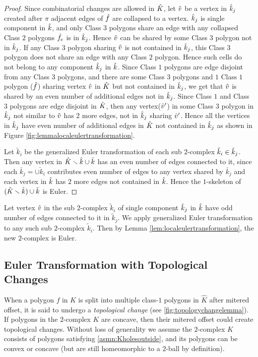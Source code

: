 \begin{proof}
  Since combinatorial changes are allowed in $\hat{K}$, let $\hat{v}$ be a vertex in $\hat{k}_j$ created after $\pi$ adjacent edges of $\hat{f}$ are collapsed to a vertex.
  $\hat{k}_j$ is single component in $\hat{k}$, and only Class $3$ polygons share an edge with any collapsed Class $2$ polygons $\hat{f}_e$ is in $\hat{k}_j$.
  Hence $\hat{v}$ can be shared by some Class $3$ polygon not in $\hat{k}_j$.
  If any Class $3$ polygon sharing $\hat{v}$ is not contained in $\hat{k}_j$, this Class $3$ polygon does not share an edge with any Class $2$ polygon.
  Hence such cells do not belong to any component $\hat{k}_j$ in $\hat{k}$.
  Since Class $1$ polygons are edge disjoint from any Class $3$ polygons, and there are some Class $3$ polygons and $1$ Class $1$ polygon ($\hat{f}$) sharing vertex $\hat{v}$ in $\hat{K}$ but not contained in $\hat{k}_j$, we get that $\hat{v}$ is shared by an even number of additional edges not in $\hat{k}_j$.
  Since Class $1$ and Class $3$ polygons are edge disjoint in $\hat{K}$, then any vertex($\hat{v}'$) in some Class $3$ polygon in $\hat{k}_j$ not similar to $\hat{v}$ has $2$ more edges, not in $\hat{k}_j$ sharing $\hat{v}'$.
  Hence all the vertices in $\hat{k}_j$ have even number of additional edges in $\hat{K}$ not contained in $\hat{k}_j$ as shown in Figure \ref{fig:lemmalocaleulertransformation}.
  
  Let $\check{k}_i$ be the generalized Euler transformation of each sub $2$-complex $\tilde{k}_i \in \hat{k}_j$.
  Then any vertex in $\hat{K} \smallsetminus \hat{k} \cup \bar{k}$ has an even number of edges connected to it, since each $\bar{k}_j = \cup \check{k}_i$ contributes even number of edges to any vertex shared by $\bar{k}_j$ and each vertex in $\hat{k}$ has $2$ more edges not contained in $\hat{k}$.
  Hence the $1$-skeleton of $(\hat{K} \smallsetminus \hat{k}) \cup \bar{k}$ is Euler. 
\end{proof}

Let vertex $\hat{v}$ in the sub $2$-complex $\tilde{k}_i$ of single component $\hat{k}_j$ in $\hat{k}$ have odd  number of edges connected to it in $\tilde{k}_j$.
We apply generalized Euler transformation to any such sub $2$-complex $\tilde{k}_i$.
Then by Lemma \ref{lem:localeulertransformation}, the new $2$-complex is Euler.



\subsection{Euler Transformation with Topological Changes}\label{sec:eulertransformwithTopolog}
When a polygon $f$ in $K$ is split into multiple class-$1$ polygons in $\hat{K}$ after mitered offset, it is said to undergo a \emph{topological change} (see \cref{fig:topologychangelemma}). 
If polygons in the $2$-complex $K$ are concave, then their mitered offset could create topological changes.
Without loss of generality we assume the $2$-complex $K$ consists of polygons satisfying \cref{asmn:Kholesoutside}, and its polygons can be convex or concave (but are still homeomorphic to a $2$-ball by definition). %

